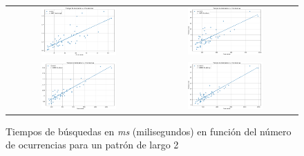 \begin{figure}[]
    \centering
    \captionsetup{position=above}
    \caption{Tiempos de búsquedas en \textit{ms} (milisegundos) en función del número de ocurrencias para un patrón de largo 2}
    \hspace*{-\marginparwidth}
    \begin{tabular}{cc} %
        \includegraphics[width=0.55\textwidth]{imagenes/Figure_3317.png} & \includegraphics[width=0.55\textwidth]{imagenes/Figure_43579.png} \\
        \includegraphics[width=0.55\textwidth]{imagenes/Figure_66532.png} & \includegraphics[width=0.55\textwidth]{imagenes/Figure_108526.png} \\

\end{tabular}
\end{figure}
